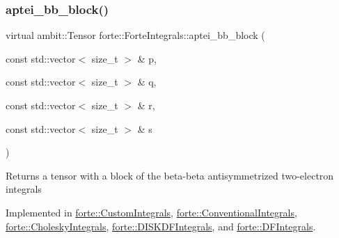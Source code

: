 \mbox{\label{classforte_1_1_forte_integrals_ae2799dc7cbfd456603a2b841b26582ab}} 
\subsubsection{\texorpdfstring{aptei\+\_\+bb\+\_\+block()}{aptei\_bb\_block()}}
{\footnotesize\ttfamily virtual ambit\+::\+Tensor forte\+::\+Forte\+Integrals\+::aptei\+\_\+bb\+\_\+block (\begin{DoxyParamCaption}\item[{const std\+::vector$<$ size\+\_\+t $>$ \&}]{p,  }\item[{const std\+::vector$<$ size\+\_\+t $>$ \&}]{q,  }\item[{const std\+::vector$<$ size\+\_\+t $>$ \&}]{r,  }\item[{const std\+::vector$<$ size\+\_\+t $>$ \&}]{s }\end{DoxyParamCaption})\hspace{0.3cm}{\ttfamily [pure virtual]}}

\begin{DoxyReturn}{Returns}
a tensor with a block of the beta-\/beta antisymmetrized two-\/electron integrals 
\end{DoxyReturn}


Implemented in \mbox{\hyperlink{classforte_1_1_custom_integrals_a71e29eaa0e9b1a84fe679e147c22398f}{forte\+::\+Custom\+Integrals}}, \mbox{\hyperlink{classforte_1_1_conventional_integrals_a85a995f80f256953f9ceeb2ea903cf0b}{forte\+::\+Conventional\+Integrals}}, \mbox{\hyperlink{classforte_1_1_cholesky_integrals_a87d158226e76e8897395384f78b3ce24}{forte\+::\+Cholesky\+Integrals}}, \mbox{\hyperlink{classforte_1_1_d_i_s_k_d_f_integrals_a4b78b82f7bb76de677a476d5982e9f89}{forte\+::\+D\+I\+S\+K\+D\+F\+Integrals}}, and \mbox{\hyperlink{classforte_1_1_d_f_integrals_a1eb5b7a379b668d0b10a0871a934b2cd}{forte\+::\+D\+F\+Integrals}}.

\mbox{\label{classforte_1_1_forte_integrals_a39cf39d6554a2ca4a4338ffda7500426}} 
